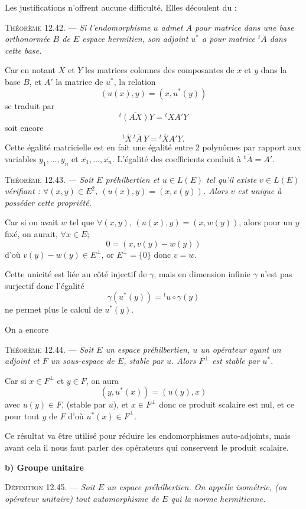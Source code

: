 Les justifications n'offrent aucune difficulté. Elles découlent du : \bookend

\medskip\noindent\textsc{Théorème 12.42.} --- \emph{Si l'endomorphisme $u$ admet $A$ pour matrice dans une base orthonormée $B$ de $E$ espace hermitien, son adjoint $u^*$ a pour matrice ${}^t\!\overline A$ dans cette base.}

Car en notant $X$ et $Y$ les matrices colonnes des composantes de $x$ et $y$ dans la base $B$, et $A'$ la matrice de $u^*$, la relation
\[
(u(x),y)=(x,u^*(y))
\]
se traduit par
\[
{}^t\!\overline{(AX)}Y={}^t\!\overline X A'Y
\]
soit encore
\[
{}^t\!\overline X\,{}^t\!\overline A\,Y={}^t\!\overline X A'Y.
\]
Cette égalité matricielle est en fait une égalité entre 2 polynômes par rapport aux variables $y_1,\ldots,y_n$ et $\overline{x_1},\ldots,\overline{x_n}$. L'égalité des coefficients conduit à ${}^t\!\overline A=A'$. \bookend

\medskip\noindent\textsc{Théorème 12.43.} --- \emph{Soit $E$ préhilbertien et $u\in L(E)$ tel qu'il existe $v\in L(E)$ vérifiant : $\forall(x,y)\in E^2$, $(u(x),y)=(x,v(y))$. Alors $v$ est unique à posséder cette propriété.}

Car si on avait $w$ tel que $\forall(x,y)$, $(u(x),y)=(x,w(y))$, alors pour un $y$ fixé, on aurait, $\forall x\in E$;
\[
0=(x,v(y)-w(y))
\]
d'où $v(y)-w(y)\in E^\perp$, or $E^\perp=\{0\}$ donc $v=w$. \bookend

Cette unicité est liée au côté injectif de $\gamma$, mais en dimension infinie $\gamma$ n'est pas surjectif donc l'égalité
\[
\gamma(u^*(y))={}^tu\circ\gamma(y)
\]
ne permet plus le calcul de $u^*(y)$.

On a encore

\medskip\noindent\textsc{Théorème 12.44.} --- \emph{Soit $E$ un espace préhilbertien, $u$ un opérateur ayant un adjoint et $F$ un sous-espace de $E$, stable par $u$. Alors $F^\perp$ est stable par $u^*$.}

Car si $x\in F^\perp$ et $y\in F$, on aura
\[
(y,u^*(x))=(u(y),x)
\]
avec $u(y)\in F$, (stable par $u$), et $x\in F^\perp$ donc ce produit scalaire est nul, et ce pour tout $y$ de $F$ d'où $u^*(x)\in F^\perp$. \bookend

Ce résultat va être utilisé pour réduire les endomorphismes auto-adjoints, mais avant cela il nous faut parler des opérateurs qui conservent le produit scalaire.

\medskip\noindent\textbf{b) Groupe unitaire}

\medskip\noindent\textsc{Définition 12.45.} --- \emph{Soit $E$ un espace préhilbertien. On appelle isométrie, (ou opérateur unitaire) tout automorphisme de $E$ qui  la norme hermitienne.}

